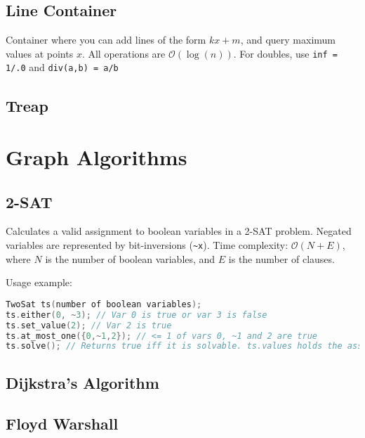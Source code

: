 \documentclass{article}
\begin{document}
\subsection*{Line Container}
Container where you can add lines of the form $kx + m$, and query maximum values at points $x$.
All operations are $\mathcal{O}(\log(n))$. For doubles, use \lstinline{inf = 1/.0} and \lstinline{div(a,b) = a/b}


\subsection*{Treap}


\section*{Graph Algorithms}

\subsection*{2-SAT}

Calculates a valid assignment to boolean variables in a 2-SAT problem.
Negated variables are represented by bit-inversions (\lstinline{~x}).
Time complexity: $\mathcal{O}(N+E)$, where $N$ is the number of boolean variables, and $E$ is the number of clauses.



Usage example:
\begin{lstlisting}[language=C++]
TwoSat ts(number of boolean variables);
ts.either(0, ~3); // Var 0 is true or var 3 is false
ts.set_value(2); // Var 2 is true
ts.at_most_one({0,~1,2}); // <= 1 of vars 0, ~1 and 2 are true
ts.solve(); // Returns true iff it is solvable. ts.values holds the assigned values to the variables
\end{lstlisting}

\pagebreak

\subsection*{Dijkstra's Algorithm}



\subsection*{Floyd Warshall}
\end{document}
